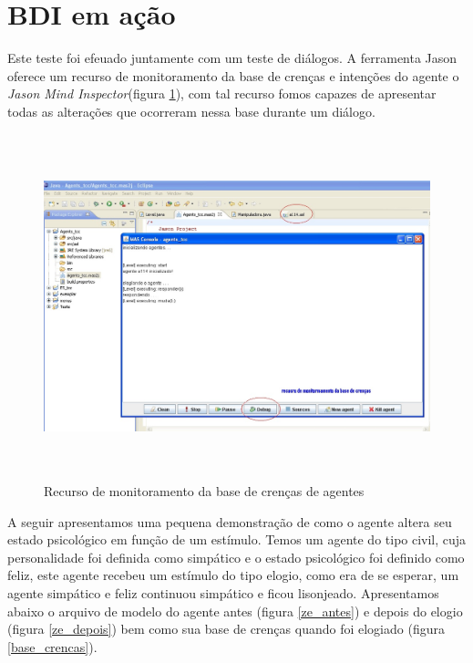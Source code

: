 \section{BDI em ação}
Este teste foi efeuado juntamente com um teste de diálogos. A ferramenta Jason oferece um recurso de monitoramento da base de crenças e intenções do agente o \emph{Jason Mind Inspector}(figura \ref{debug}), com tal recurso fomos capazes de apresentar todas as alterações que ocorreram nessa base durante um diálogo.
\begin{figure}
\centering
\includegraphics [height=10cm]{figuras/rodando_elogio_jose.jpg}
\caption{Recurso de monitoramento da base de crenças de agentes}
\label{debug}
\end{figure}

A seguir apresentamos uma pequena demonstração de como o agente altera seu estado psicológico em função de um estímulo.
Temos um agente do tipo civil, cuja personalidade foi definida como simpático e o estado psicológico foi definido como feliz, este agente recebeu um estímulo do tipo elogio, como era de se esperar, um agente simpático e feliz continuou simpático e ficou lisonjeado. Apresentamos abaixo o arquivo de modelo do agente antes (figura \ref{ze_antes}) e depois do elogio (figura \ref{ze_depois}) bem como sua base de crenças quando foi elogiado (figura \ref{base_crencas}).


